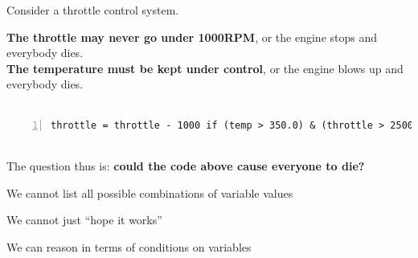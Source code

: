\documentclass{beamer}
\newcommand{\red}[1]{
\textcolor{red}{#1}
}
\begin{document}
\begin{frame}[fragile]
Consider a throttle control system. 

\textbf{The throttle may never go under 1000RPM}, or the engine stops and everybody dies. \\

\textbf{The temperature must be kept under control}, or the engine blows up and everybody dies. \\

\ \\
\begin{lstlisting}[frame=shadowbox,numbers=left]
throttle = throttle - 1000 if (temp > 350.0) & (throttle > 2500) else throttle
\end{lstlisting}

\ \\

The question thus is: \textbf{could the code above cause everyone to die?}

\end{frame}


\begin{slide}{
\item We cannot list all possible combinations of variable values
\item We cannot just ``hope it works''
\pause
\item We can reason in terms of conditions on variables
}\end{slide}
\end{document}
